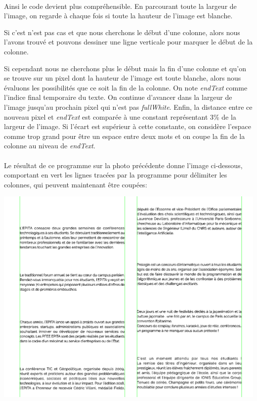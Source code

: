 \documentclass{article}
\begin{document}
	\paragraph{}
	Ainsi le code devient plus compréhensible. En parcourant toute la largeur de l'image, on regarde à chaque fois si toute la hauteur de l'image est blanche. 
	\par
	Si c'est n'est pas cas et que nous cherchons le début d'une colonne, alors nous l'avons trouvé et pouvons dessiner une ligne verticale pour marquer le début de la colonne.
	\par
	Si cependant nous ne cherchons plus le début mais la fin d'une colonne et qu'on se trouve sur un pixel dont la hauteur de l'image est toute blanche, alors nous évaluons les possibilités que ce soit la fin de la colonne. On note \textit{endText} comme l'indice final temporaire du texte. On continue d'avancer dans la largeur de l'image jusqu'au prochain pixel qui n'est pas \textit{fullWhite}. Enfin, la distance entre ce nouveau pixel et \textit{endText} est comparée à une constant représentant 3\% de la largeur de l'image. Si l'écart est supérieur à cette constante, on considère l'espace comme trop grand pour être un espace entre deux mots et on coupe la fin de la colonne au niveau de \textit{endText}. \\
	
	\paragraph{}
	Le résultat de ce programme sur la photo précédente donne l'image ci-dessous, comportant en vert les lignes tracées par la programme pour délimiter les colonnes, qui peuvent maintenant être coupées: \\
	
	\begin{center}
		\includegraphics[scale=0.3]{columns}
	\end{center}
	
\end{document}
